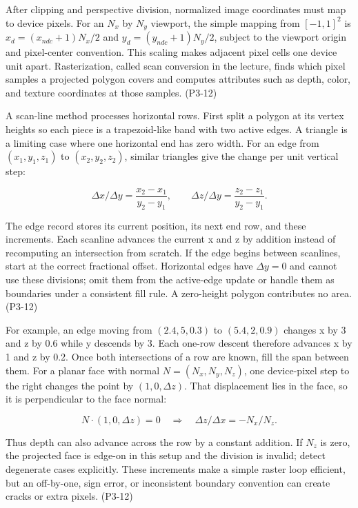 \hypertarget{03-visual-computing-i-ch018-rasterization-turn-projected-polygons-into-pixel-samples}{}

After clipping and perspective division, normalized image coordinates must map to device pixels. For an \(N_x\) by \(N_y\) viewport, the simple mapping from \([-1,1]^2\) is \(x_d=(x_{ndc}+1)N_x/2\) and \(y_d=(y_{ndc}+1)N_y/2\), subject to the viewport origin and pixel-center convention. This scaling makes adjacent pixel cells one device unit apart. Rasterization, called scan conversion in the lecture, finds which pixel samples a projected polygon covers and computes attributes such as depth, color, and texture coordinates at those samples. (P3-12)

A scan-line method processes horizontal rows. First split a polygon at its vertex heights so each piece is a trapezoid-like band with two active edges. A triangle is a limiting case where one horizontal end has zero width. For an edge from \((x_1,y_1,z_1)\) to \((x_2,y_2,z_2)\), similar triangles give the change per unit vertical step:

\[
\Delta x/\Delta y=\frac{x_2-x_1}{y_2-y_1},\qquad
\Delta z/\Delta y=\frac{z_2-z_1}{y_2-y_1}.
\]

The edge record stores its current position, its next end row, and these increments. Each scanline advances the current x and z by addition instead of recomputing an intersection from scratch. If the edge begins between scanlines, start at the correct fractional offset. Horizontal edges have \(\Delta y=0\) and cannot use these divisions; omit them from the active-edge update or handle them as boundaries under a consistent fill rule. A zero-height polygon contributes no area. (P3-12)

For example, an edge moving from \((2.4,5,0.3)\) to \((5.4,2,0.9)\) changes x by 3 and z by 0.6 while y descends by 3. Each one-row descent therefore advances x by 1 and z by 0.2. Once both intersections of a row are known, fill the span between them. For a planar face with normal \(N=(N_x,N_y,N_z)\), one device-pixel step to the right changes the point by \((1,0,\Delta z)\). That displacement lies in the face, so it is perpendicular to the face normal:

\[
N\cdot(1,0,\Delta z)=0\quad\Rightarrow\quad\Delta z/\Delta x=-N_x/N_z.
\]

Thus depth can also advance across the row by a constant addition. If \(N_z\) is zero, the projected face is edge-on in this setup and the division is invalid; detect degenerate cases explicitly. These increments make a simple raster loop efficient, but an off-by-one, sign error, or inconsistent boundary convention can create cracks or extra pixels. (P3-12)

